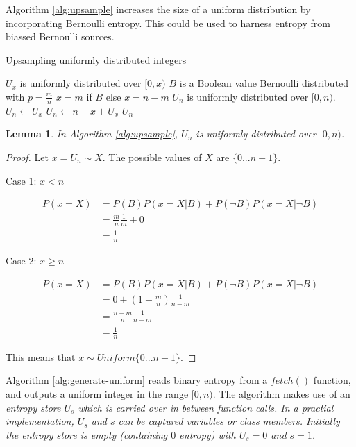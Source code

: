 \documentclass[12pt]{article}
\newtheorem{lemma}{Lemma}
\begin{document}
Algorithm \ref{alg:upsample} increases the size of a uniform distribution by incorporating Bernoulli entropy. This could be used to harness entropy from biassed Bernoulli sources.

\begin{algorithm}
\caption{Upsampling uniformly distributed integers}
\label{alg:upsample}
\begin{algorithmic}[1]
\Require $U_x$ is uniformly distributed over $[0,x)$
\Require $B$ is a Boolean value Bernoulli distributed with $p=\frac{m}{n}$
\Require $x=m$ if $B$ else $x=n-m$
\Ensure $U_n$ is uniformly distributed over $[0,n)$.
    \State $U_n \gets U_x$  
  \Else
    \State $U_n \gets n-x+U_x$  
  \EndIf
  \State \Return $U_n$
\EndProcedure
\end{algorithmic}
\end{algorithm}

\begin{lemma}
In Algorithm \ref{alg:upsample}, $U_{n}$ is uniformly distributed over $[0,n)$.
\end{lemma}

\begin{proof}
Let $x = U_{n} \sim X$. The possible values of $X$ are $\{0 ... n-1\}$.

Case 1: $x<n$

\begin{align}
P(x=X) & = P(B)P(x=X|B) + P(\neg B)P(x=X|\neg B) \\
       & = \frac{m}{n}\frac{1}{m} + 0 \\
       & = \frac{1}{n}
\end{align}

Case 2: $x \ge n$

\begin{align}
P(x=X) & = P(B)P(x=X|B) + P(\neg B)P(x=X|\neg B) \\
       & = 0 + (1 - \frac{m}{n})\frac{1}{n-m}  \\
       & = \frac{n - m}{n}\frac{1}{n-m} \\
       & = \frac{1}{n}
\end{align}

This means that $x \sim Uniform\{0...n-1\}$.
\end{proof}

Algorithm \ref{alg:generate-uniform} reads binary entropy from a $fetch()$ function, and outputs a uniform integer in the range $[0,n)$. The algorithm makes use of an \em entropy store \em $U_s$ which is carried over in between function calls. In a practial implementation, $U_s$ and $s$ can be captured variables or class members. Initially the entropy store is empty (containing $0$ entropy) with $U_s = 0$ and $s=1$.
\end{document}

